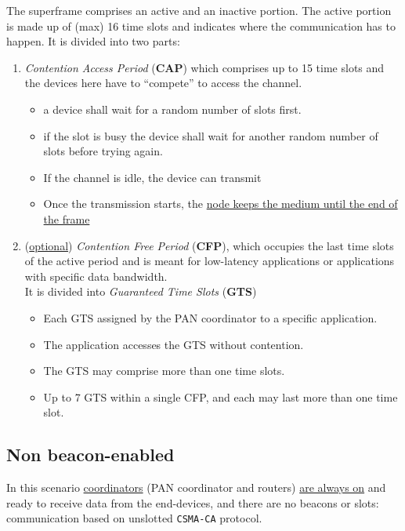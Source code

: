 The superframe comprises an active and an inactive portion. The active portion is made up of (max) 16 time slots and indicates where the communication has to happen.
It is divided into two parts:
\begin{enumerate}
   \item \textit{Contention Access Period} (\textbf{CAP})
   which comprises up to 15 time slots and the devices here have to ``compete'' to access the channel.
   \begin{itemize}
      \item a device shall wait for a random number of slots first.
      \item if the slot is busy the device shall wait for another random number of slots before
      trying again.
      \item If the channel is idle, the device can transmit
      \item Once the transmission starts, the \ul{node keeps the medium until the end of the frame}
   \end{itemize}
   \item (\ul{optional}) \textit{Contention Free Period} (\textbf{CFP}), which occupies the last time slots of the active period and is meant for low-latency applications or applications with specific data bandwidth.\\
   It is divided into \textit{Guaranteed Time Slots} (\textbf{GTS})
   \begin{itemize}
      \item Each GTS assigned by the PAN coordinator to a specific application.
      \item The application accesses the GTS without contention.
      \item The GTS may comprise more than one time slots.
      \item Up to 7 GTS within a single CFP, and each may last more than one time slot.
   \end{itemize}
\end{enumerate}

\subsection{Non beacon-enabled}
In this scenario \ul{coordinators} (PAN coordinator and routers) \ul{are always on} and ready to receive data from the end-devices, and there are no beacons or slots: communication based on unslotted \texttt{CSMA-CA} protocol.

